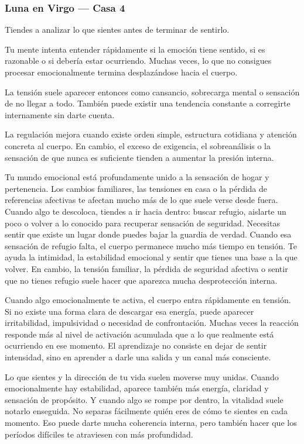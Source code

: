 \documentclass[11pt,a4paper]{article}
\begin{document}
\subsubsection*{Luna en Virgo — Casa 4}

Tiendes a analizar lo que sientes antes de terminar de sentirlo.

Tu mente intenta entender rápidamente si la emoción tiene sentido, si es razonable o si debería estar ocurriendo. Muchas veces, lo que no consigues procesar emocionalmente termina desplazándose hacia el cuerpo.

La tensión suele aparecer entonces como cansancio, sobrecarga mental o sensación de no llegar a todo. También puede existir una tendencia constante a corregirte internamente sin darte cuenta.

La regulación mejora cuando existe orden simple, estructura cotidiana y atención concreta al cuerpo. En cambio, el exceso de exigencia, el sobreanálisis o la sensación de que nunca es suficiente tienden a aumentar la presión interna.

Tu mundo emocional está profundamente unido a la sensación de hogar y pertenencia. Los cambios familiares, las tensiones en casa o la pérdida de referencias afectivas te afectan mucho más de lo que suele verse desde fuera. Cuando algo te descoloca, tiendes a ir hacia dentro: buscar refugio, aislarte un poco o volver a lo conocido para recuperar sensación de seguridad. Necesitas sentir que existe un lugar donde puedes bajar la guardia de verdad. Cuando esa sensación de refugio falta, el cuerpo permanece mucho más tiempo en tensión. Te ayuda la intimidad, la estabilidad emocional y sentir que tienes una base a la que volver. En cambio, la tensión familiar, la pérdida de seguridad afectiva o sentir que no tienes refugio suele hacer que aparezca mucha desprotección interna.

Cuando algo emocionalmente te activa, el cuerpo entra rápidamente en tensión. Si no existe una forma clara de descargar esa energía, puede aparecer irritabilidad, impulsividad o necesidad de confrontación. Muchas veces la reacción responde más al nivel de activación acumulada que a lo que realmente está ocurriendo en ese momento. El aprendizaje no consiste en dejar de sentir intensidad, sino en aprender a darle una salida y un canal más consciente.

Lo que sientes y la dirección de tu vida suelen moverse muy unidas. Cuando emocionalmente hay estabilidad, aparece también más energía, claridad y sensación de propósito. Y cuando algo se rompe por dentro, la vitalidad suele notarlo enseguida. No separas fácilmente quién eres de cómo te sientes en cada momento. Eso puede darte mucha coherencia interna, pero también hacer que los períodos difíciles te atraviesen con más profundidad.
\end{document}
